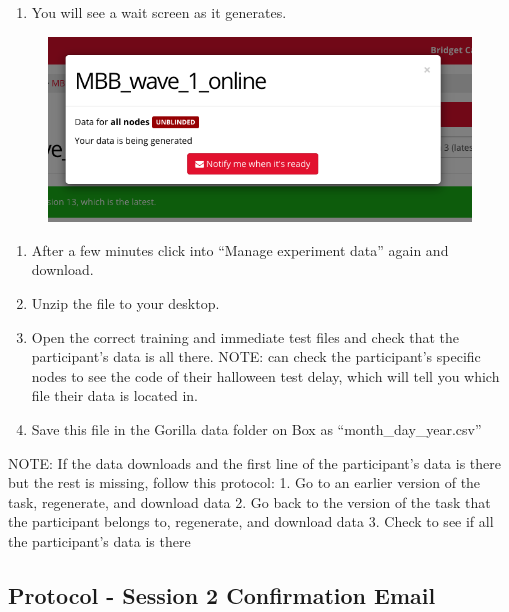 \documentclass[]{book}
\providecommand{\tightlist}{%
  \setlength{\itemsep}{0pt}\setlength{\parskip}{0pt}}
\begin{document}
\begin{enumerate}
\def\labelenumi{\arabic{enumi}.}
\setcounter{enumi}{4}
\tightlist
\item
  You will see a wait screen as it generates.
\end{enumerate}

\begin{figure}
\centering
\includegraphics{images/gorilla/9.png}
\caption{}
\end{figure}

\begin{enumerate}
\def\labelenumi{\arabic{enumi}.}
\setcounter{enumi}{5}
\tightlist
\item
  After a few minutes click into ``Manage experiment data'' again and download.
\item
  Unzip the file to your desktop.
\item
  Open the correct training and immediate test files and check that the participant's data is all there. NOTE: can check the participant's specific nodes to see the code of their halloween test delay, which will tell you which file their data is located in.
\item
  Save this file in the Gorilla data folder on Box as ``month\_day\_year.csv''
\end{enumerate}

NOTE: If the data downloads and the first line of the participant's data is there but the rest is missing, follow this protocol:
1. Go to an earlier version of the task, regenerate, and download data
2. Go back to the version of the task that the participant belongs to, regenerate, and download data
3. Check to see if all the participant's data is there

\hypertarget{protocol---session-2-confirmation-email}{%
\subsection{Protocol - Session 2 Confirmation Email}\label{protocol---session-2-confirmation-email}}
\end{document}
